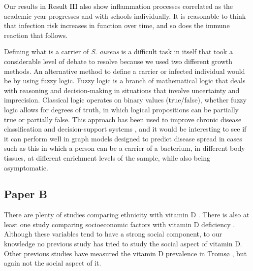 
Our results in \colorbox{ResultColor}{\textcolor{black}{Result III}} also show inflammation processes correlated as the academic year progresses and with schools individually. It is reasonable to think that infection risk increases in function over time, and so does the immune reaction that follows. 


Defining what is a carrier of \textit{S. aureus} is a difficult task in itself that took a considerable level of debate to resolve because we used two different growth methods. An alternative method to define a carrier or infected individual would be by using fuzzy logic. Fuzzy logic is a branch of mathematical logic that deals with reasoning and decision-making in situations that involve uncertainty and imprecision. Classical logic operates on binary values (true/false), whether fuzzy logic allows for degrees of truth, in which logical propositions can be partially true or partially false. This approach has been used to improve chronic disease classification and decision-support systems \cite{Thukral2019, Amirkhani2017}, and it would be interesting to see if it can perform well in graph models designed to predict disease spread in cases such as this in which a person can be a carrier of a bacterium, in different body tissues, at different enrichment levels of the sample, while also being asymptomatic.



\subsection{Paper B}

There are plenty of studies comparing ethnicity with vitamin D \cite{Holvik2004, Bjrk2013, Martin2016, Nielsen2014, 2017, Ceccarelli2019, Smith2021}. There is also at least one study comparing socioeconomic factors with vitamin D deficiency \cite{Navarro2013}. Although these variables tend to have a strong social component, to our knowledge no previous study has tried to study the social aspect of vitamin D. Other previous studies have measured the vitamin D prevalence in Tromsø \cite{berg2014, Jorde2015, ref:berg2022}, but again not the social aspect of it.


